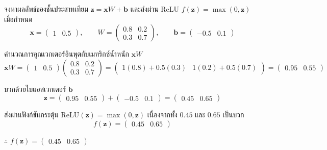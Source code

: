 \begin{ex}
\label{ex:neural-layer}
จงหาผลลัพธ์ของชั้นประสาทเทียม $\mathbf{z} = \mathbf{x} W + \mathbf{b}$ และส่งผ่าน ReLU $f(\mathbf{z}) = \max(0, \mathbf{z})$ เมื่อกำหนด
\[ \mathbf{x} = \begin{pmatrix} 1 & 0.5 \end{pmatrix}, \qquad W = \begin{pmatrix} 0.8 & 0.2 \\ 0.3 & 0.7 \end{pmatrix}, \qquad \mathbf{b} = \begin{pmatrix} -0.5 & 0.1 \end{pmatrix} \]
\end{ex}
\begin{solution}
คำนวณการคูณเวกเตอร์อินพุตกับเมทริกซ์น้ำหนัก $\mathbf{x}W$ \[ \mathbf{x}W = \begin{pmatrix} 1 & 0.5 \end{pmatrix}\begin{pmatrix} 0.8 & 0.2 \\ 0.3 & 0.7 \end{pmatrix} = \begin{pmatrix} 1(0.8)+0.5(0.3) & 1(0.2)+0.5(0.7) \end{pmatrix} = \begin{pmatrix} 0.95 & 0.55 \end{pmatrix} \]

บวกด้วยไบแอสเวกเตอร์ $\mathbf{b}$ \[ \mathbf{z} = \begin{pmatrix} 0.95 & 0.55 \end{pmatrix} + \begin{pmatrix} -0.5 & 0.1 \end{pmatrix} = \begin{pmatrix} 0.45 & 0.65 \end{pmatrix} \]

ส่งผ่านฟังก์ชันกระตุ้น $\mathrm{ReLU}(\mathbf{z}) = \max(0, \mathbf{z})$ เนื่องจากทั้ง $0.45$ และ $0.65$ เป็นบวก
    \[ f(\mathbf{z}) = \begin{pmatrix} 0.45 & 0.65 \end{pmatrix} \]

$\therefore$ $f(\mathbf{z}) = \begin{pmatrix} 0.45 & 0.65 \end{pmatrix}$ \solhere
\end{solution}

